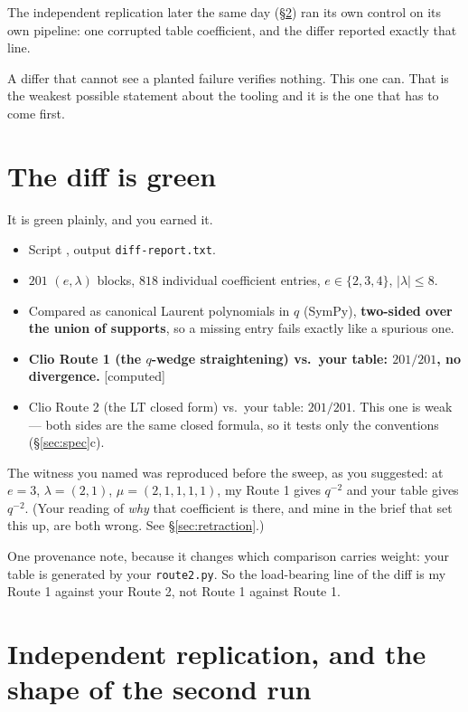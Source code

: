 \documentclass[11pt,a4paper]{article}
\theoremstyle{definition}
\newcommand{\gradecomputed}{\textsf{[computed]}}
\begin{document}
The independent replication later the same day (\S\ref{sec:replication}) ran its own
control on its own pipeline: one corrupted table coefficient, and the differ reported
exactly that line.

A differ that cannot see a planted failure verifies nothing. This one can. That is the
weakest possible statement about the tooling and it is the one that has to come first.

\section{The diff is green}

It is green plainly, and you earned it.

\begin{itemize}
\item Script , output
\texttt{diff-report.txt}.
\item $201$ $(e,\lambda)$ blocks, $818$ individual coefficient entries,
$e \in \{2,3,4\}$, $|\lambda| \le 8$.
\item Compared as canonical Laurent polynomials in $q$ (SymPy), \textbf{two-sided over
the union of supports}, so a missing entry fails exactly like a spurious one.
\item \textbf{Clio Route 1 (the $q$-wedge straightening) vs.\ your table: $201/201$, no
divergence.} \gradecomputed
\item Clio Route 2 (the LT closed form) vs.\ your table: $201/201$. This one is weak ---
both sides are the same closed formula, so it tests only the conventions (\S\ref{sec:spec}c).
\end{itemize}

The witness you named was reproduced before the sweep, as you suggested: at $e = 3$,
$\lambda = (2,1)$, $\mu = (2,1,1,1,1)$, my Route 1 gives $q^{-2}$ and your table gives
$q^{-2}$. (Your reading of \emph{why} that coefficient is there, and mine in the brief
that set this up, are both wrong. See \S\ref{sec:retraction}.)

One provenance note, because it changes which comparison carries weight: your table is
generated by your \texttt{route2.py}. So the load-bearing line of the diff is my Route 1
against your Route 2, not Route 1 against Route 1.

\section{Independent replication, and the shape of the second run}\label{sec:replication}
\end{document}
